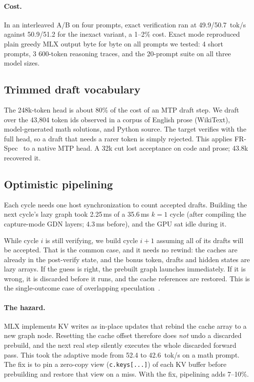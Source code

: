 \documentclass[11pt]{article}
\begin{document}
\paragraph{Cost.} In an interleaved A/B on four prompts, exact verification ran at 49.9/50.7~tok/s against 50.9/51.2 for the inexact variant, a 1--2\% cost. Exact mode reproduced plain greedy MLX output byte for byte on all prompts we tested: 4 short prompts, 3 600-token reasoning traces, and the 20-prompt suite on all three model sizes.

\subsection{Trimmed draft vocabulary}
The 248k-token head is about 80\% of the cost of an MTP draft step. We draft over the 43{,}804 token ids observed in a corpus of English prose (WikiText), model-generated math solutions, and Python source. The target verifies with the full head, so a draft that needs a rarer token is simply rejected. This applies FR-Spec~\cite{zhao2025frspec} to a native MTP head. A 32k cut lost acceptance on code and prose; 43.8k recovered it.

\subsection{Optimistic pipelining}
Each cycle needs one host synchronization to count accepted drafts. Building the next cycle's lazy graph took 2.25\,ms of a 35.6\,ms $k{=}1$ cycle (after compiling the capture-mode GDN layers; 4.3\,ms before), and the GPU sat idle during it.

While cycle $i$ is still verifying, we build cycle $i{+}1$ assuming all of its drafts will be accepted. That is the common case, and it needs no rewind: the caches are already in the post-verify state, and the bonus token, drafts and hidden states are lazy arrays. If the guess is right, the prebuilt graph launches immediately. If it is wrong, it is discarded before it runs, and the cache references are restored. This is the single-outcome case of overlapping speculation~\cite{liu2025pearl,kumar2026ssd}.

\paragraph{The hazard.} MLX implements KV writes as in-place updates that rebind the cache array to a new graph node. Resetting the cache offset therefore does \emph{not} undo a discarded prebuild, and the next real step silently executes the whole discarded forward pass. This took the adaptive mode from 52.4 to 42.6~tok/s on a math prompt. The fix is to pin a zero-copy view (\texttt{c.keys[...]}) of each KV buffer before prebuilding and restore that view on a miss. With the fix, pipelining adds 7--10\%.
\end{document}
